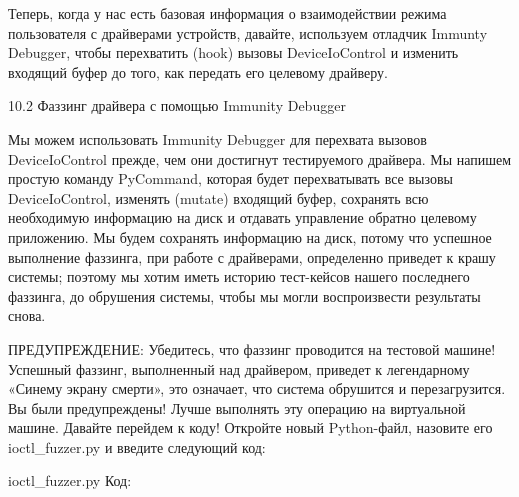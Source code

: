 \documentclass[12pt]{book}
\begin{document}
Теперь, когда у нас есть базовая информация о взаимодействии режима пользователя с драйверами устройств, давайте, используем отладчик Immunty Debugger, чтобы перехватить (hook) вызовы DeviceIoControl и изменить входящий буфер до того, как передать его целевому драйверу. 


10.2 Фаззинг драйвера с помощью Immunity Debugger

Мы можем использовать Immunity Debugger для перехвата вызовов DeviceIoControl прежде, чем они достигнут тестируемого драйвера. Мы напишем простую команду PyCommand, которая будет перехватывать все вызовы DeviceIoControl, изменять (mutate) входящий буфер, сохранять всю необходимую информацию на диск и отдавать управление обратно целевому приложению. Мы будем сохранять информацию на диск, потому что успешное выполнение фаззинга, при работе с драйверами, определенно приведет к крашу системы; поэтому мы хотим иметь историю тест-кейсов нашего последнего фаззинга, до обрушения системы, чтобы мы могли воспроизвести результаты снова.

ПРЕДУПРЕЖДЕНИЕ: Убедитесь, что фаззинг проводится на тестовой машине! Успешный фаззинг, выполненный над драйвером, приведет к легендарному «Синему экрану смерти», это означает, что система обрушится и перезагрузится. Вы были предупреждены! Лучше выполнять эту операцию на виртуальной машине.
Давайте перейдем к коду! Откройте новый Python-файл, назовите его ioctl\_fuzzer.py и введите следующий код:

ioctl\_fuzzer.py
Код:

    


        
        
\end{document}
